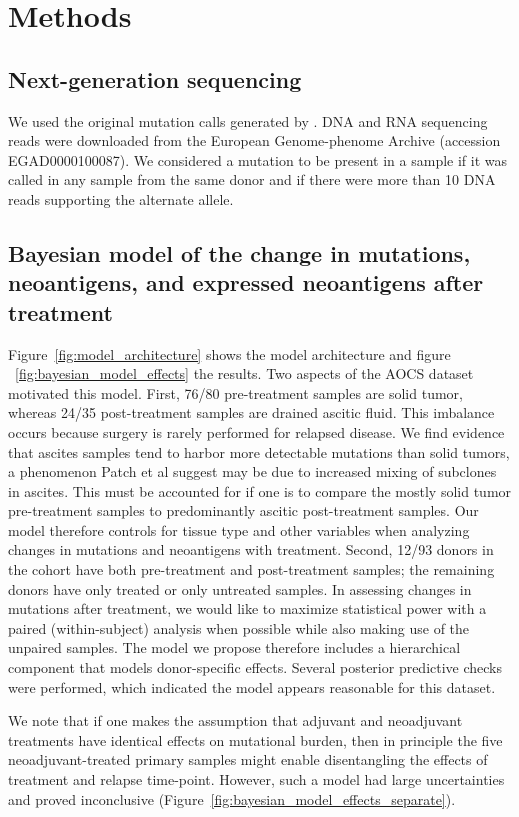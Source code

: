 \section*{Methods}

\subsection*{Next-generation sequencing}
We used the original mutation calls generated by \cite{Patch_2015}. DNA and RNA sequencing reads were downloaded from the European Genome-phenome Archive (accession EGAD0000100087). We considered a mutation to be present in a sample if it was called in any sample from the same donor and if there were more than 10 DNA reads supporting the alternate allele.

\subsection*{Bayesian model of the change in mutations, neoantigens, and expressed neoantigens after treatment}
Figure~\ref{fig:model_architecture} shows the model architecture and figure ~\ref{fig:bayesian_model_effects} the results. Two aspects of the AOCS dataset motivated this model. First, 76/80 pre-treatment samples are solid tumor, whereas 24/35 post-treatment samples are drained ascitic fluid. This imbalance occurs because surgery is rarely performed for relapsed disease. We find evidence that ascites samples tend to harbor more detectable mutations than solid tumors, a phenomenon Patch et al suggest may be due to increased mixing of subclones in ascites. This must be accounted for if one is to compare the mostly solid tumor pre-treatment samples to predominantly ascitic post-treatment samples. Our model therefore controls for tissue type and other variables when analyzing changes in mutations and neoantigens with treatment. Second, 12/93 donors in the cohort have both pre-treatment and post-treatment samples; the remaining donors have only treated or only untreated samples. In assessing changes in mutations after treatment, we would like to maximize statistical power with a paired (within-subject) analysis when possible while also making use of the unpaired samples. The model we propose therefore includes a hierarchical component that models donor-specific effects. Several posterior predictive checks were performed, which indicated the model appears reasonable for this dataset. 

We note that if one makes the assumption that adjuvant and neoadjuvant treatments have identical effects on mutational burden, then in principle the five neoadjuvant-treated primary samples might enable disentangling the effects of treatment and relapse time-point. However, such a model had large uncertainties and proved inconclusive (Figure~\ref{fig:bayesian_model_effects_separate}). 

